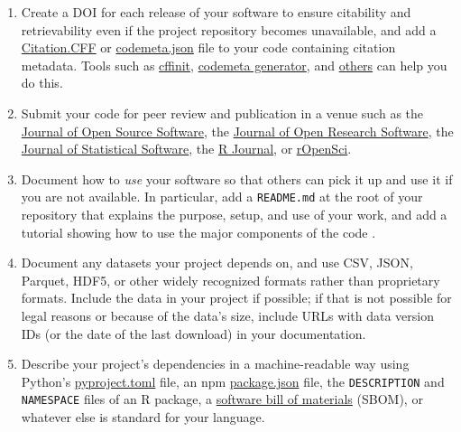 \documentclass[10pt,letterpaper]{article}
\begin{document}
\begin{enumerate}

\item
  Create a DOI for each release of your software to ensure citability and retrievability even if the project repository becomes unavailable, and add a \href{https://citation-file-format.github.io/}{Citation.CFF}
  or \href{https://codemeta.github.io}{codemeta.json} file to your code \cite{Druskat2021}
  containing citation metadata.
  Tools such as \href{https://citation-file-format.github.io/cff-initializer-javascript/}{cffinit},
  \href{https://codemeta.github.io/codemeta-generator/}{codemeta generator},
  and \href{https://github.com/citation-file-format/citation-file-format/blob/main/README.md\#tools-to-work-with-citationcff-files-wrench}{others} can help you do this.

\item
  Submit your code for peer review and publication in a venue such as
  the \href{https://joss.theoj.org/}{Journal of Open Source Software},
  the \href{https://openresearchsoftware.metajnl.com/}{Journal of Open Research Software},
  the \href{http://www.jstatsoft.org}{Journal of Statistical Software},
  the \href{https://journal.r-project.org/}{R Journal},
  or \href{https://ropensci.org/}{rOpenSci}.

\item
  Document how to \emph{use} your software so that others can pick it up and use it if you are not available.
  In particular, add a \texttt{README.md} at the root of your repository that explains the purpose, setup, and use of your work,
  and add a tutorial showing how to use the major components of the code
  \cite{Lee2018b,Huybrechts2024,Littauer2025,Katz2025,Turing2025}.

\item
  Document any datasets your project depends on, and use CSV, JSON, Parquet, HDF5, or other widely recognized formats rather than proprietary formats. Include the data in your project if possible; if that is not possible for legal reasons or because of the data's size, include URLs with data version IDs (or the date of the last download) in your documentation.

\item
  Describe your project's dependencies in a machine-readable way
  using Python's \href{https://packaging.python.org/en/latest/guides/writing-pyproject-toml/}{pyproject.toml} file,
  an npm \href{https://docs.npmjs.com/cli/v10/configuring-npm/package-json?v=true}{package.json} file,
  the \texttt{DESCRIPTION} and \texttt{NAMESPACE} files of an R package,
  a \href{https://openssf.org/technical-initiatives/sbom-tools/}{software bill of materials} (SBOM),
  or whatever else is standard for your language.


\end{enumerate}
\end{document}
